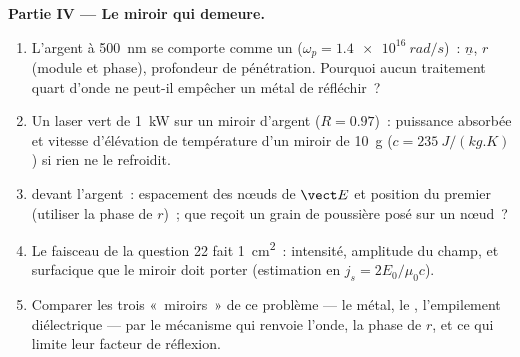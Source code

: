 \begin{problem}
\medskip
\noindent\textbf{Partie IV --- Le miroir qui demeure.}
\begin{enumerate}[resume]
  \item L'argent à \qty{500}{nm} se comporte comme un  ($\omega_p = \qty{1.4e16}{rad/s}$)~:
        $\underline n$, $r$ (module et phase), profondeur de pénétration. Pourquoi aucun
        traitement quart d'onde ne peut-il empêcher un métal de réfléchir~?
  \item Un laser vert de \qty{1}{kW} sur un miroir d'argent ($R = 0.97$)~: puissance
        absorbée et vitesse d'élévation de température d'un miroir de \qty{10}{g}
        ($c = \qty{235}{J/(kg.K)}$) si rien ne le refroidit.
  \item {} devant l'argent~: espacement des nœuds de
        $\vect E$ et position du premier (utiliser la phase de $r$)~;
        que reçoit un grain de poussière posé sur un nœud~?
  \item Le faisceau de la question 22 fait \qty{1}{cm^2}~: intensité, amplitude
        du champ, et  surfacique que le miroir doit
        porter (estimation en  $j_s = 2E_0/\mu_0c$).
  \item Comparer les trois «~miroirs~» de ce problème --- le métal, le
        , l'empilement diélectrique --- par le mécanisme qui renvoie
        l'onde, la phase de $r$, et ce qui limite leur
        facteur de réflexion.
\end{enumerate}
\end{problem}
